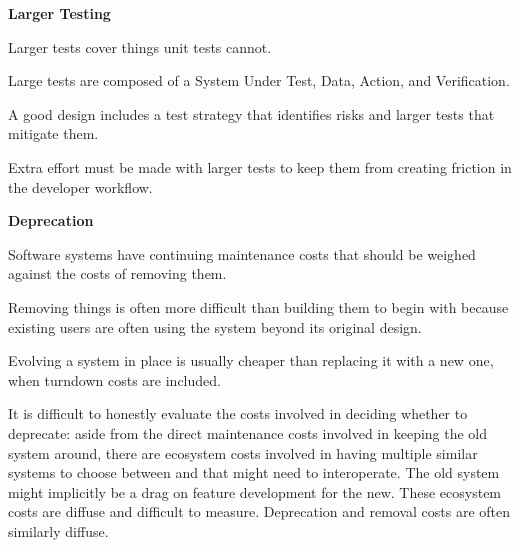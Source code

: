 \item \textbf{Larger Testing}
\bit
\item Larger tests cover things unit tests cannot.
\item Large tests are composed of a System Under Test, Data, Action, and Verification.
\item A good design includes a test strategy that identifies risks and larger tests that mitigate them.
\item Extra effort must be made with larger tests to keep them from creating friction in the developer workflow.
\eit


\item \textbf{Deprecation}
\bit
\item Software systems have continuing maintenance costs that should be weighed against the costs of removing them.
\item Removing things is often more difficult than building them to begin with because existing users are often using
the system beyond its original design.
\item Evolving a system in place is usually cheaper than replacing it with a new one, when turndown costs are included.
\item It is difficult to honestly evaluate the costs involved in deciding whether to deprecate: aside from the direct
maintenance costs involved in keeping the old system around, there are ecosystem costs involved in having multiple
similar systems to choose between and that might need to interoperate. The old system might implicitly be a drag on
feature development for the new. These ecosystem costs are diffuse and difficult to measure. Deprecation and removal
costs are often similarly diffuse.
\eit

